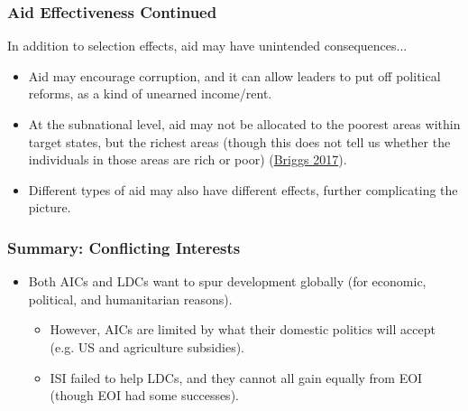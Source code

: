 \documentclass[handout]{beamer}
\begin{document}
\begin{frame} 
	\frametitle{\LARGE{Aid Effectiveness Continued}}
In addition to selection effects, aid may have unintended consequences...
	\begin{itemize}
		\item Aid may encourage corruption, and it can allow leaders to put off political reforms, as a kind of unearned income/rent. \pause
		\item At the subnational level, aid may not be allocated to the poorest areas within target states, but the richest areas (though this does not tell us whether the individuals in those areas are rich or poor) (\href{https://static1.squarespace.com/static/5acc1ee17e3c3a103525fb2b/t/5acd1cbe352f53f7b76961d2/1523391678922/Briggs+\%282017\%29+Aid+Target+Poorest.pdf}{Briggs 2017}).
		\item Different types of aid may also have different effects, further complicating the picture.
	\end{itemize}
\end{frame}

\begin{frame} 
	\frametitle{\LARGE{Summary: Conflicting Interests}}
	\begin{itemize}
		\item Both AICs and LDCs want to spur development globally (for economic, political, and humanitarian reasons). \pause 
		\begin{itemize}
			\item However, AICs are limited by what their domestic politics will accept (e.g. US and agriculture subsidies). \pause 
			\item ISI failed to help LDCs, and they cannot all gain equally from EOI (though EOI had some successes).  
		\end{itemize}
	\end{itemize}
\end{frame}
\end{document}
